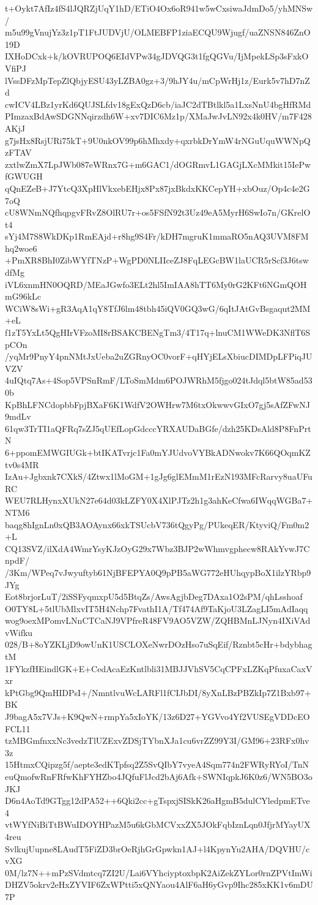 t+Oykt7AfIz4fS4lJQRZjUqY1hD/ETiO4Ox6oR941w5wCxsiwaJdmDo5/yhMNSw/
m5u99gVnujYz3z1pT1FtJUDVjU/OLMEBFP1ziaECQU9Wjugf/uaZNSN846ZnO19D
IXHoDCxk+k/kOVRUPOQ6EIdVPw34gJDVQG3t1fgQGVu/IjMpekLSp3sFxkOVfiPJ
lVssDFzMpTepZlQbjyESU43yLZBA0gz+3/9hJY4u/mCpWrHj1z/Eurk5v7hD7nZd
cwICV4LBz1yrKd6QUJSLfdv18gExQzD6cb/iaJC2dTBtlkl5a1LxsNnU4bgHfRMd
PImzaxBdAwSDGNNqirzdh6W+xv7DIC6Mz1p/XMaJwJvLN92x4k0HV/m7F428AKjJ
g7jsHx8RsjURi75kT+9U0nkOV99p6hMhxdy+qxrbkDrYmW4rNGuUquWWNpQzFTAV
zxtlwZmX7LpJWb087eWRnx7G+m6GAC1/dOGRmvL1GAGjLXcMMkit15IePwfGWUGH
qQnEZeB+J7YtcQ3XpHlVkxebEHjx8Px87jxBkdxKKCepYH+xbOuz/Op4c4e2G7oQ
cU8WNmNQfhqpgvFRvZ8OlRU7r+os5FSfN92t3Uz49eA5MyrH6SwIo7n/GKrelOt4
sYj4M7S8WkDKp1RmEAjd+r8hg9S4Fr/kDH7mgruK1mmaRO5nAQ3UVM8FMhq2woe6
+PmXR8BhI0ZibWYfTNzP+WgPD0NLIIceZJ8FqLEGcBW1laUCR5rScf3J6tswdfMg
iVL6xnmHN0OQRD/MEaJGwfo3ELt2hl5ImIAA8hTT6My0rG2KFt6NGmQOHmG96kLc
WCiW8sWi+gR3AqA1qY8TfJ6lm48tbh45iQV0GQ3wG/6qItJAtGvBsgaqut2MM+eL
f1zT5YxLt5QgHIrVFzoMI8rBSAKCBENgTm3/4T17q+lnuCM1WWeDK3NflT6SpCOn
/yqMr9PnyY4pnNMtJxUeba2uZGRnyOC0vorF+qHYjELsXbiucDIMDpLFPiqJUVZV
4uIQtq7As+4Sop5VPSnRmF/LToSmMdm6POJWRhM5fjgo024tJdql5btW85ad530b
KpBhLFNCdopbbFpjBXaF6K1WdfV2OWHrw7M6txOkwwvGIxO7gj5sAfZFwNJ9mdLv
61qw3TrTI1aQFRq7sZJ5qUEfLopGdcccYRXAUDaBGfe/dzh25KDsAld8P8FnPrtN
6+ppomEMWGIUGk+btIKATvrjc1Fa0mYJUdvoVYBkADNwokv7K66QOqmKZtv0s4MR
IzAu+Jgbxnk7CXkS/4Ztwx1lMoGM+1gJg6glEMmM1rEzN193MFcRarvy8uaUFuRC
WEU7RLHynxXUkN27e64d03kLZFY0X4XlPJTz2h1g3ahKeCfwa6IWqqWGBa7+NTM6
baqg8hIgnLn0xQB3AOAynx66xkTSUcbV736tQgyPg/PUkeqER/KtyviQ/Fm0m2+L
CQ13SVZ/ilXdA4WmrYsyKJzOyG29x7Wbz3BJP2wWhmvgphecw8RAkYvwJ7CnpdF/
/3Km/WPeq7vJwyuftyb61NjBFEPYA0Q9pPB5aWG772eHUhqypBoX1ilzYRbp9JYg
Eot8brjorLuT/2iSSFyqmxpU5d5BtqZs/AwsAgjbDeg7DAxa1O2sPM/qhLsshoaf
O0TY8L+5tlUbMlxvIT5H4Nchp7FvathI1A/Tf474Af9TaKjoU3LZagLI5mAdIaqq
wog9oexMPomvLNnCTCaNJ9VPfreR48FV9AO5VZW/ZQHBMnLJNyn4IXiVAdvWifku
028/B+8oYZKLjD9owUnK1USCLOXeNwrDOzHso7uSqEif/Rznbt5cHr+bdybhagtM
1FYkzfHEindlGK+E+CedAcaEzKntlbli31MBJJVhSV5CqCPFxLZKqPfuxaCaxVxr
kPtGbg9QmHIDPsI+/NmntlvuWcLARFl1fCIJbDI/8yXnLBzPBZkIp7Z1Bxb97+BK
J9bagA5x7VJs+K9QwN+rmpYa5xIoYK/13z6D27+YGVvo4Yf2VUSEgVDDcEOFCL11
tzMBGmfnxxNc3vedzTlUZExvZDSjTYbnXJa1cu6vrZZ99Y3I/GM96+23RFx0hv3z
15HtmxCQipzg5f/aepte3edKTpfsq2Z5SvQIbY7vyeA4Sqm774n2FWRyRYoI/TnN
euQmofwRnFRfwKhFYHZbo4JQfuFlJcd2bAj6Afk+SWNIqpkJ6K0z6/WN5BO3oJKJ
D6n4AoTd9GTgg12dPA52++6Qki2cc+gTspxjSISkK26aHgmB5dulCYledpmETve4
vtWYfNiBiTtBWuIDOYHPazM5u6kGbMCVxxZX5JOkFqbIznLqn0JfjrMYayUX4reu
SvlkujUupne8LAudT5FiZD3brOeRjhGrGpwkn1AJ+l4KpynYu2AHA/DQVHU/cvXG
0M/lz7N++mPzSVdmtcq7ZI2U/Lai6VYhciyptoxbpK2AiZekZYLor0rnZPVtImWi
DHZV5okrv2eHxZYVIF6ZxWPtti5xQNYaou4AlF6aH6yGvp9Ihc285xKK1v6mDU7P
